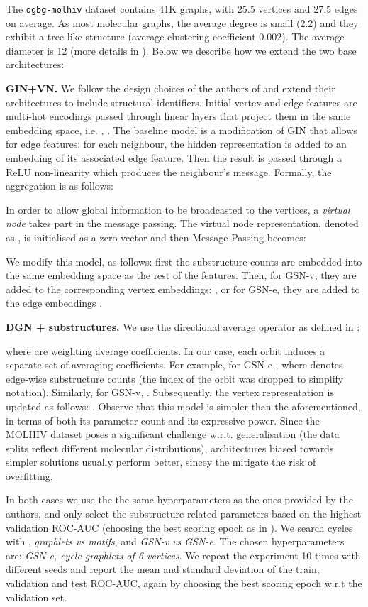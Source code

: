The \texttt{ogbg-molhiv} dataset contains  41K graphs, with 25.5 vertices and 27.5 edges on average. As most molecular graphs, the average degree is small (2.2) and they exhibit a tree-like structure (average clustering coefficient 0.002). The average diameter is 12 (more details in \cite{DBLP:ogb}). Below we describe how we extend the two base architectures:

\medskip
\noindent\textbf{GIN+VN. } We follow the design choices of the authors of \cite{DBLP:ogb} and extend their architectures to include structural identifiers. Initial vertex and edge features are multi-hot encodings passed through linear layers that project them in the same embedding space, i.e. , .
The baseline model is a modification of GIN that allows for edge features: for each neighbour, the hidden representation is added to an embedding of its associated edge feature. Then the result is passed through a ReLU non-linearity which produces the neighbour's message. Formally, the aggregation is as follows:


In order to allow global information to be broadcasted to the vertices, a \textit{virtual node} takes part in the message passing. The virtual node representation, denoted as , is initialised as a zero vector  and then Message Passing becomes:
  

We modify this model, as follows: first the substructure counts are embedded into the same embedding space as the rest of the features. Then, for GSN-v, they are added to the corresponding vertex embeddings:  , or for GSN-e, they are added to the edge embeddings . 

\medskip
\noindent\textbf{DGN + substructures. } 
We use the directional average operator as defined in \cite{beaini2020directional}:

 where  are weighting average coefficients. In our case, each orbit  induces a separate set of averaging coefficients. For example, for GSN-e 
 , where  denotes edge-wise substructure counts (the index of the orbit  was dropped to simplify notation). Similarly, for GSN-v, .
Subsequently, the vertex representation is updated as follows:  . Observe that this model is simpler than the aforementioned,  in terms of both its parameter count and its expressive power. Since the MOLHIV dataset poses a significant challenge w.r.t. generalisation (the data splits reflect different molecular distributions), architectures biased towards simpler solutions usually perform better, sincey the mitigate the risk of overfitting.


In both cases we use the the same hyperparameters as the ones provided by the authors, and only select the substructure related parameters based on the highest validation ROC-AUC (choosing the best scoring epoch as in \cite{DBLP:ogb}). We search cycles with , \textit{graphlets vs motifs}, and \textit{GSN-v vs GSN-e}. The chosen hyperparameters are: \textit{GSN-e, cycle graphlets of 6 vertices}.
We repeat the experiment 10 times with different seeds and report the mean and standard deviation of the train, validation and test ROC-AUC, again by choosing the best scoring epoch w.r.t the validation set. 





